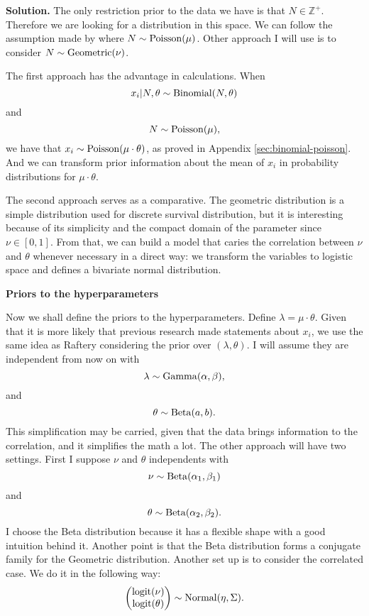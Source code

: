 \vspace{2ex}

    {\bf Solution.} The only restriction prior to the data we have is that $N \in
    \mathbb{Z}^+$. Therefore we are looking for a distribution in this space.
    We can follow the assumption made by \cite[]{Raftery1988} where $N \sim
    \operatorname{Poisson}(\mu)$. Other approach I will use is to consider $N \sim \operatorname{Geometric}(\nu)$.

    The first approach has the advantage in calculations. When 
    $$x_i | N, \theta \sim \operatorname{Binomial}(N,\theta)$$ and $$N \sim \operatorname{Poisson}(\mu),$$ we have that $x_i \sim
    \operatorname{Poisson}(\mu\cdot\theta)$, as proved in Appendix \ref{sec:binomial-poisson}.
    And we can transform prior information about the mean of $x_i$ in
    probability distributions for $\mu\cdot\theta$.

    \ind The second approach serves as a comparative. The geometric
    distribution is a simple distribution used for discrete survival
    distribution, but it is interesting because of its simplicity and the
    compact domain of the parameter since $\nu \in [0,1]$. 
    From that, we
    can build a model that caries the correlation between $\nu$ and $\theta$
    whenever necessary in a direct way: we transform the variables to logistic
    space and defines a bivariate normal distribution.

    \vspace{2ex}

    {\bf Priors to the hyperparameters}

    \vspace{2ex}

    Now we shall define the priors to the hyperparameters. Define $\lambda =
    \mu\cdot\theta$. Given that it is more likely that previous research made
    statements about $x_i$, we use the same idea as Raftery considering the
    prior over $(\lambda, \theta)$. I will assume they are independent from
    now on with 
    $$
    \lambda \sim \operatorname{Gamma}(\alpha, \beta),
    $$
    and
    $$
    \theta \sim \operatorname{Beta}(a,b).
    $$
    This simplification may be carried, given that the data brings information
    to the correlation, and it simplifies the math a lot.
    The other approach will have two settings. First I suppose $\nu$ and
    $\theta$ independents with 
    $$
    \nu \sim \operatorname{Beta}(\alpha_1, \beta_1)
    $$
    and
    $$
    \theta \sim \operatorname{Beta}(\alpha_2, \beta_2).
    $$
    I choose the Beta distribution because it has a flexible shape with
    a good intuition behind it. Another point is that the Beta distribution
    forms a conjugate family for the Geometric distribution. Another set up is
    to consider the correlated case. We do it in the following way:
    $$
    \begin{pmatrix}
        \operatorname{logit}(\nu) \\ \operatorname{logit}(\theta) 
    \end{pmatrix} \sim \operatorname{Normal}(\eta, \Sigma).
    $$


